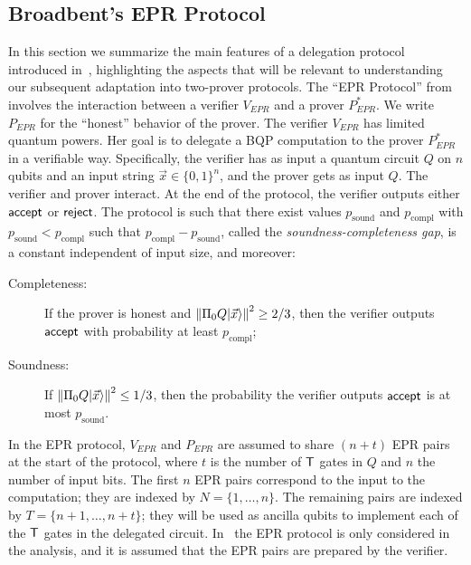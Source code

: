 \subsection{Broadbent's EPR Protocol}
\label{sec:EPR-protocol}


In this section we summarize the main features of a delegation protocol introduced in~\cite{broadbent15howtoverify}, highlighting the aspects that will be relevant to understanding our subsequent adaptation into two-prover protocols. The ``EPR Protocol'' from \cite{broadbent15howtoverify} involves the interaction between a verifier $V_{EPR}$ and a prover $P_{EPR}^*$. We write $P_{EPR}$ for the ``honest'' behavior of the prover. The verifier $V_{EPR}$ has limited quantum powers. Her goal is to delegate a BQP computation to the prover $P_{EPR}^*$ in a verifiable way. Specifically, the verifier has as input a quantum circuit $Q$ on $n$ qubits and an input string $\vec{x}\in\{0,1\}^n$, and the prover gets as input $Q$. The verifier and prover interact. At the end of the protocol, the verifier outputs either $\sf accept$ or $\sf reject$. The protocol is such that there exist values $p_{\mathrm{sound}}$ and $p_{\mathrm{compl}}$ with $p_{\mathrm{sound}}< p_{\mathrm{compl}}$ such that $p_{\mathrm{compl}}-p_{\mathrm{sound}}$, called the \emph{soundness-completeness gap}, is a constant independent of input size, and moreover:

\begin{description}
\item[Completeness:] If the prover is honest and $\left\|\Pi_0Q|\vec{x}\rangle\right\|^2 \geq 2/3$, then the verifier outputs $\sf accept$ with probability at least $p_{\mathrm{compl}}$;  
\item[Soundness:] If $\left\|\Pi_0Q|\vec{x}\rangle\right\|^2 \leq 1/3$, then the probability the verifier outputs $\sf accept$ is at most $p_{\mathrm{sound}}$.
\end{description}




In the EPR protocol, $V_{EPR}$ and $P_{EPR}$ are assumed to share $(n+t)$ EPR pairs at the start of the protocol, where $t$ is the number of $\sf T$ gates in $Q$ and $n$ the number of input bits. 
 The first $n$ EPR pairs correspond to the input to the computation; they are indexed by $N=\{1,\dots,n\}$. The remaining pairs are indexed by $T=\{n+1,\dots,n+t\}$; they will be used as ancilla qubits to  implement each of the $\sf T$ gates in the delegated circuit. 
 In~\cite{broadbent15howtoverify} the EPR protocol is only considered in the analysis, and it is assumed that the EPR pairs are prepared by the verifier.

